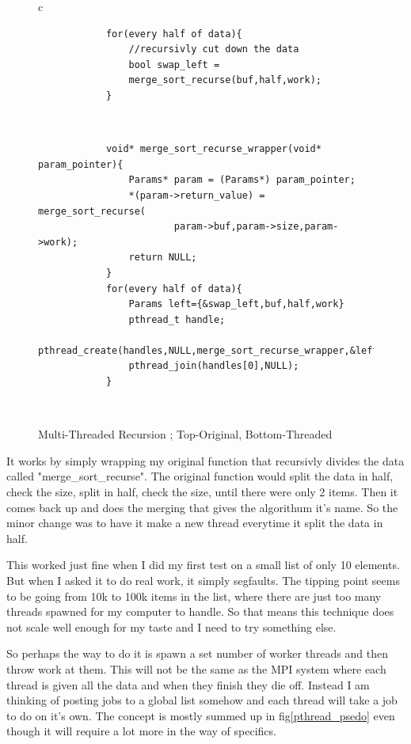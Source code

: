 \documentclass[12pt]{article}
\begin{document}
\begin{figure}[htb]
	\centering
	\begin{tabular}{ c }
		\hline
		\begin{minipage}[t]{0.9\textwidth}
		\begin{verbatim}
			for(every half of data){
				//recursivly cut down the data
				bool swap_left =
				merge_sort_recurse(buf,half,work);
			}
		\end{verbatim}
		\end{minipage}
		\\ \hline
		\begin{minipage}[t]{0.9\textwidth}
		\begin{verbatim}
			void* merge_sort_recurse_wrapper(void* param_pointer){
				Params* param = (Params*) param_pointer;
				*(param->return_value) = merge_sort_recurse(
						param->buf,param->size,param->work);
				return NULL;
			}
			for(every half of data){
				Params left={&swap_left,buf,half,work}
				pthread_t handle;
				pthread_create(handles,NULL,merge_sort_recurse_wrapper,&left);
				pthread_join(handles[0],NULL);
			}
		\end{verbatim}
		\end{minipage}
		\\ \hline
	\end{tabular}
	\caption{Multi-Threaded Recursion ; Top-Original, Bottom-Threaded}
	\label{bad_recursive_threading}
\end{figure}

It works by simply wrapping my original function that recursivly divides the data called "merge\_sort\_recurse".
The original function would split the data in half, check the size, split in half, check the size, until there were only 2 items.
Then it comes back up and does the merging that gives the algorithum it's name.
So the minor change was to have it make a new thread everytime it split the data in half.

This worked just fine when I did my first test on a small list of only 10 elements.
But when I asked it to do real work, it simply segfaults.
The tipping point seems to be going from 10k to 100k items in the list, where there are just too many threads spawned for my computer to handle.
So that means this technique does not scale well enough for my taste and I need to try something else.

So perhaps the way to do it is spawn a set number of worker threads and then throw work at them.
This will not be the same as the MPI system where each thread is given all the data and when they finish they die off.
Instead I am thinking of posting jobs to a global list somehow and each thread will take a job to do on it's own.
The concept is mostly summed up in fig\ref{pthread_psedo} even though it will require a lot more in the way of specifics.
\end{document}
